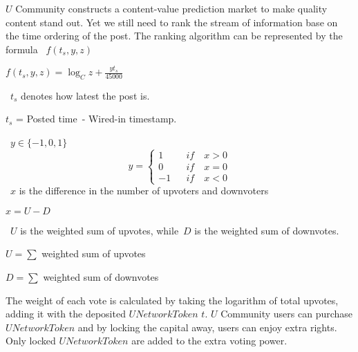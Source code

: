 $U$ Community constructs a content-value prediction market to make quality content stand out. Yet we still need to rank the stream of information base on the time ordering of the post. The ranking algorithm can be represented by the formula \ $f(t_s,y,z)$
\begin{center}
$f(t_s,y,z) = \log_{C} z + \frac{yt_s}{45000}$
\end{center}
\  $t_s$ denotes how latest the post is. 
\begin{center}
    $t_s$ = Posted time\ - Wired-in timestamp. 
\end{center}
\ $y \in \{-1,0,1\}$
$$y =\left\{
\begin{array}{rcl}
1       &      & {if \quad x > 0}\\
0     &      & {if \quad x = 0}\\
-1     &      & {if \quad x < 0}
\end{array} \right. $$
\ $x$ is the difference in the number of upvoters and downvoters
\begin{center}
        $x = U - D$
\end{center}
\  $U$ is the weighted sum of upvotes, while\ $D$ is the weighted sum of downvotes. 
\begin{center}
$U = \sum$ {weighted sum of upvotes} 
\end{center}
\begin{center}
$D = \sum$ {weighted sum of downvotes} 
\end{center}
The weight of each vote is calculated by taking the logarithm of total upvotes, adding it with the deposited $UNetworkToken$ $t$.
$U$ Community users can purchase $UNetworkToken$ and by locking the capital away, users can enjoy extra rights. Only locked $UNetworkToken$ are added to the extra voting power. \par

